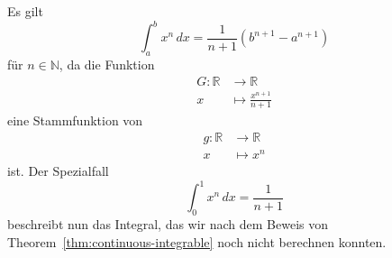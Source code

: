 \documentclass[../main.tex]{subfiles}
\begin{document}
\begin{example}
  Es gilt
  \[
    \int_{a}^{b} x^n \, dx = \frac{1}{n+1} (b^{n+1} - a^{n+1})
  \]
  für $n \in \mathbb{N}$, da die Funktion
  \begin{align*}
    G \colon \mathbb{R} & \to \mathbb{R} \\
    x & \mapsto \frac{x^{n+1}}{n+1}
  \end{align*}
  eine Stammfunktion von
  \begin{align*}
    g \colon \mathbb{R} & \to \mathbb{R} \\
    x & \mapsto x^n
  \end{align*}
  ist. Der Spezialfall
  \[
    \int_{0}^{1} x^n \, dx = \frac{1}{n+1}
  \]
  beschreibt nun das Integral, das wir nach
  dem Beweis von Theorem~\ref{thm:continuous-integrable}
  noch nicht berechnen konnten.
\end{example}
\end{document}
